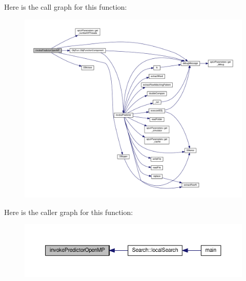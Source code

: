 Here is the call graph for this function\-:\nopagebreak
\begin{figure}[H]
\begin{center}
\leavevmode
\includegraphics[width=350pt]{candidates_8hh_a06a4390403bfbe9df4c986a3c8f07d28_cgraph}
\end{center}
\end{figure}




Here is the caller graph for this function\-:\nopagebreak
\begin{figure}[H]
\begin{center}
\leavevmode
\includegraphics[width=350pt]{candidates_8hh_a06a4390403bfbe9df4c986a3c8f07d28_icgraph}
\end{center}
\end{figure}


